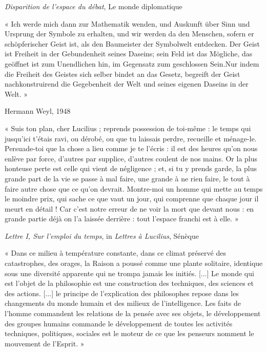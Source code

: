 \documentclass{article}
\begin{document}
\begin{flushright}\textit{Disparition de l’espace du débat}, Le monde diplomatique\end{flushright}
\vspace{7pt}
\begin{center} « Ich werde mich dann zur Mathematik wenden, und Auskunft über Sinn und Ursprung der Symbole zu erhalten, und wir werden da den Menschen, sofern er schöpferischer Geist ist, als den Baumeister der Symbolwelt entdecken. Der Geist ist Freiheit in der Gebundenheit seines Daseins; sein Feld ist das Mögliche, das geöffnet ist zum Unendlichen hin, im Gegensatz zum geschlossen Sein.Nur indem die Freiheit des Geistes sich selber bindet an das Gesetz, begreift der Geist nachkonstruirend die Gegebenheit der Welt und seines eigenen Daseins in der Welt. » \end{center}

\begin{flushright}Hermann Weyl, 1948\end{flushright}
\vspace{7pt}
\begin{center} « Suis ton plan, cher Lucilius ; reprends possession de toi-même : le temps qui jusqu’ici t’étais ravi, ou dérobé, ou que tu laissais perdre, recueille et ménage-le. Persuade-toi que la chose a lieu comme je te l’écris : il est des heures qu’on nous enlève par force, d’autres par supplice, d’autres coulent de nos mains. Or la plus honteuse perte est celle qui vient de négligence ; et, si tu y prends garde, la plus grande part de la vie se passe à mal faire, une grande à ne rien faire, le tout à faire autre chose que ce qu’on devrait. Montre-moi un homme qui mette au temps le moindre prix, qui sache ce que vaut un jour, qui comprenne que chaque jour il meurt en détail ! Car c’est notre erreur de ne voir la mort que devant nous : en grande partie déjà on l’a laissée derrière : tout l’espace franchi est à elle. » \end{center}

\begin{flushright}\textit{Lettre I, Sur l’emploi du temps}, in \textit{Lettres à Lucilius}, Sénèque\end{flushright}
\vspace{8pt}
\begin{center} « Dans ce milieu à température constante, dans ce climat préservé des catastrophes, des orages, la Raison a poussé comme une plante solitaire, identique sous une diversité apparente qui ne trompa jamais les initiés. [...] Le monde qui est l’objet de la philosophie est une construction des techniques, des sciences et des actions. [...] le principe de l’explication des philosophes repose dans les changements du monde humain et des milieux de l’intelligence. Les faits de l’homme commandent les relations de la pensée avec ses objets, le développement des groupes humains commande le développement de toutes les activités techniques, politiques, sociales est le moteur de ce que les penseurs nomment le mouvement de l’Esprit. » \end{center} 
\end{document}
